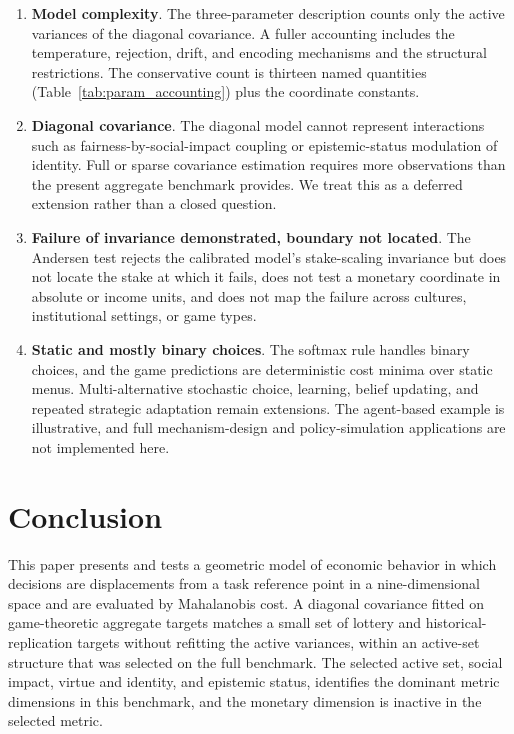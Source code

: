 \documentclass[journal]{IEEEtran}
\begin{document}
\begin{enumerate}
    \item \textbf{Model complexity}. The three-parameter description counts only the active variances of the diagonal covariance. A fuller accounting includes the temperature, rejection, drift, and encoding mechanisms and the structural restrictions. The conservative count is thirteen named quantities (Table~\ref{tab:param_accounting}) plus the coordinate constants.
    \item \textbf{Diagonal covariance}. The diagonal model cannot represent interactions such as fairness-by-social-impact coupling or epistemic-status modulation of identity. Full or sparse covariance estimation requires more observations than the present aggregate benchmark provides. We treat this as a deferred extension rather than a closed question.
    \item \textbf{Failure of invariance demonstrated, boundary not located}. The Andersen test rejects the calibrated model's stake-scaling invariance but does not locate the stake at which it fails, does not test a monetary coordinate in absolute or income units, and does not map the failure across cultures, institutional settings, or game types.
    \item \textbf{Static and mostly binary choices}. The softmax rule handles binary choices, and the game predictions are deterministic cost minima over static menus. Multi-alternative stochastic choice, learning, belief updating, and repeated strategic adaptation remain extensions. The agent-based example is illustrative, and full mechanism-design and policy-simulation applications are not implemented here.
\end{enumerate}

\section{Conclusion}
\label{sec:conclusion}

This paper presents and tests a geometric model of economic behavior in which decisions are displacements from a task reference point in a nine-dimensional space and are evaluated by Mahalanobis cost.
A diagonal covariance fitted on game-theoretic aggregate targets matches a small set of lottery and historical-replication targets without refitting the active variances, within an active-set structure that was selected on the full benchmark.
The selected active set, social impact, virtue and identity, and epistemic status, identifies the dominant metric dimensions in this benchmark, and the monetary dimension is inactive in the selected metric.
\end{document}
